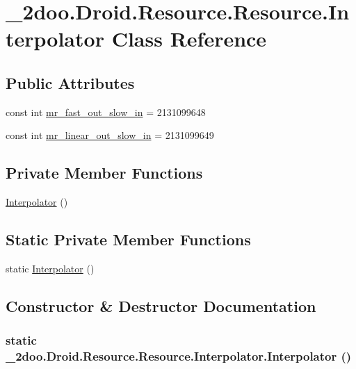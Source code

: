 \hypertarget{class__2doo_1_1_droid_1_1_resource_1_1_interpolator}{
\section{\_\-2doo.Droid.Resource.Resource.Interpolator Class Reference}
\label{class__2doo_1_1_droid_1_1_resource_1_1_interpolator}
}
\subsection*{Public Attributes}
\begin{CompactItemize}
\item 
const int \hyperlink{class__2doo_1_1_droid_1_1_resource_1_1_interpolator_dbcf29cded916c4980118b79e5236535}{mr\_\-fast\_\-out\_\-slow\_\-in} = 2131099648
\item 
const int \hyperlink{class__2doo_1_1_droid_1_1_resource_1_1_interpolator_b7116ac4039731b22d455a3b5539f840}{mr\_\-linear\_\-out\_\-slow\_\-in} = 2131099649
\end{CompactItemize}
\subsection*{Private Member Functions}
\begin{CompactItemize}
\item 
\hyperlink{class__2doo_1_1_droid_1_1_resource_1_1_interpolator_e0b1f5f02599ec7e0eb2381eec78967a}{Interpolator} ()
\end{CompactItemize}
\subsection*{Static Private Member Functions}
\begin{CompactItemize}
\item 
static \hyperlink{class__2doo_1_1_droid_1_1_resource_1_1_interpolator_83a819d783ff9951b6ddf96ee49332a8}{Interpolator} ()
\end{CompactItemize}


\subsection{Constructor \& Destructor Documentation}
\hypertarget{class__2doo_1_1_droid_1_1_resource_1_1_interpolator_83a819d783ff9951b6ddf96ee49332a8}{
\subsubsection[{Interpolator}]{\setlength{\rightskip}{0pt plus 5cm}static \_\-2doo.Droid.Resource.Resource.Interpolator.Interpolator ()}}
\label{class__2doo_1_1_droid_1_1_resource_1_1_interpolator_83a819d783ff9951b6ddf96ee49332a8}


